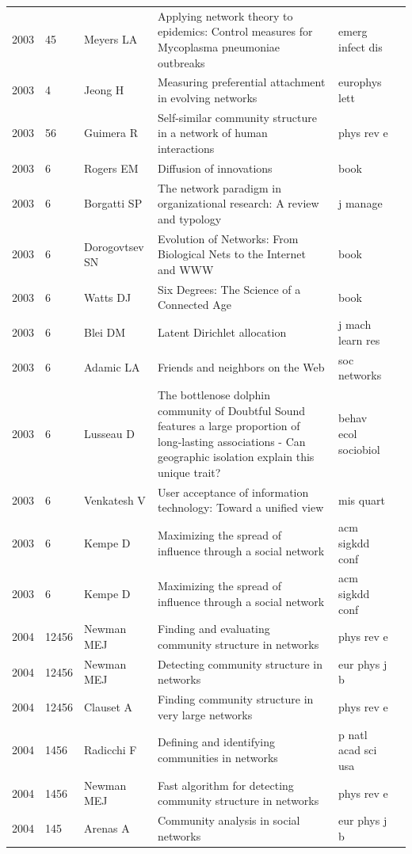 \documentclass[11pt]{article} %
\begin{document}
\begin{landscape}
\begin{longtable}{p{0.7cm}|p{0.8cm}|p{3cm}|p{14.5cm}|p{3.5cm}l}
2003& 	45& 	 Meyers LA& 	 Applying network theory to epidemics: Control measures for Mycoplasma pneumoniae outbreaks& 	 emerg infect dis\\
2003& 	4& 	 Jeong H& 	 Measuring preferential attachment in evolving networks& 	 europhys lett\\
2003& 	56& 	 Guimera R& 	 Self-similar community structure in a network of human interactions& 	 phys rev e\\
2003& 	6& 	 Rogers EM& 	 Diffusion of innovations& 	 book\\
2003& 	6& 	 Borgatti SP& 	 The network paradigm in organizational research: A review and typology& 	 j manage\\
2003& 	6& 	 Dorogovtsev SN& 	 Evolution of Networks: From Biological Nets to the Internet and WWW& 	 book\\
2003& 	6& 	 Watts DJ& 	 Six Degrees: The Science of a Connected Age& 	 book\\
2003& 	6& 	 Blei DM& 	 Latent Dirichlet allocation& 	 j mach learn res\\
2003& 	6& 	 Adamic LA& 	 Friends and neighbors on the Web& 	 soc networks\\
2003& 	6& 	 Lusseau D& 	 The bottlenose dolphin community of Doubtful Sound features a large proportion of long-lasting associations - Can geographic isolation explain this unique trait?& 	 behav ecol sociobiol\\
2003& 	6& 	 Venkatesh V& 	 User acceptance of information technology: Toward a unified view& 	 mis quart\\
2003& 	6& 	 Kempe D & 	Maximizing the spread of influence through a social network& 	acm sigkdd conf \\
2003& 	6& 	 Kempe D & 	 Maximizing the spread of influence through a social network& 	 acm sigkdd conf \\
2004& 	12456& 	 Newman MEJ& 	 Finding and evaluating community structure in networks& 	 phys rev e\\
2004& 	12456& 	 Newman MEJ& 	 Detecting community structure in networks& 	 eur phys j b\\
2004& 	12456& 	 Clauset A& 	 Finding community structure in very large networks& 	 phys rev e\\
2004& 	1456& 	 Radicchi F& 	 Defining and identifying communities in networks& 	 p natl acad sci usa\\
2004& 	1456& 	 Newman MEJ& 	 Fast algorithm for detecting community structure in networks& 	 phys rev e\\
2004& 	145& 	 Arenas A& 	 Community analysis in social networks& 	 eur phys j b\\

\end{longtable}
\end{landscape}
\end{document}
